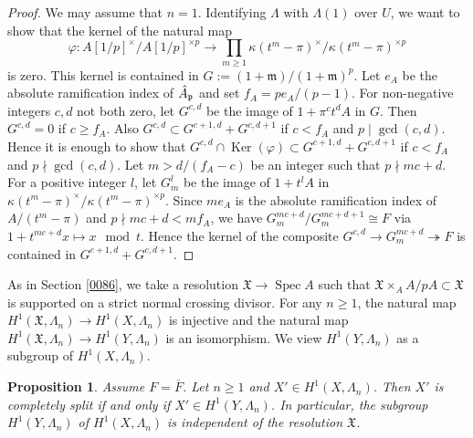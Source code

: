 \documentclass{amsart}
\newtheorem{Prop}[Thm]{Proposition}
\theoremstyle{remark}
\numberwithin{equation}{section}
\newcommand{\onto}{\twoheadrightarrow}
\newcommand{\closure}[1]{\overline{#1}}
\newcommand{\ideal}[1]{\mathfrak{#1}}
\DeclareMathOperator{\Ker}{Ker}
\DeclareMathOperator{\Spec}{Spec}
\begin{document}
\begin{proof}
	We may assume that $n = 1$.
	Identifying $\Lambda$ with $\Lambda(1)$ over $U$,
	we want to show that the kernel of the natural map
		\[
				\varphi
			\colon
				A[1 / p]^{\times} / A[1 / p]^{\times p}
			\to
				\prod_{m \ge 1}
					\kappa(t^{m} - \pi)^{\times} / \kappa(t^{m} - \pi)^{\times p}
		\]
	is zero.
	This kernel is contained in $G := (1 + \ideal{m}) /  (1 + \ideal{m})^{p}$.
	Let $e_{A}$ be the absolute ramification index of $\Hat{A}_{\ideal{p}}$
	and set $f_{A} = p e_{A} / (p - 1)$.
	For non-negative integers $c, d$ not both zero,
	let $G^{c, d}$ be the image of $1 + \pi^{c} t^{d} A$ in $G$.
	Then $G^{c, d} = 0$ if $c \ge f_{A}$.
	Also $G^{c, d} \subset G^{c + 1, d} + G^{c, d + 1}$
	if $c < f_{A}$ and $p \mid \gcd(c, d)$.
	Hence it is enough to show that
	$G^{c, d} \cap \Ker(\varphi) \subset G^{c + 1, d} + G^{c, d + 1}$
	if $c < f_{A}$ and $p \nmid \gcd(c, d)$.
	Let $m > d / (f_{A} - c)$ be an integer such that $p \nmid m c + d$.
	For a positive integer $l$,
	let $G_{m}^{l}$ be the image of $1 + t^{l} A$ in
	$\kappa(t^{m} - \pi)^{\times} / \kappa(t^{m} - \pi)^{\times p}$.
	Since $m e_{A}$ is the absolute ramification index of $A / (t^{m} - \pi)$
	and $p \nmid m c + d < m f_{A}$,
	we have $G_{m}^{m c + d} / G_{m}^{m c + d + 1} \cong F$
	via $1 + t^{m c + d} x \mapsto x \mod t$.
	Hence the kernel of the composite
		$
				G^{c, d}
			\to
				G_{m}^{m c + d}
			\onto
				F
		$
	is contained in $G^{c + 1, d} + G^{c, d + 1}$.
\end{proof}

As in Section \ref{0086},
we take a resolution $\mathfrak{X} \to \Spec A$
such that $\mathfrak{X} \times_{A} A / p A \subset \mathfrak{X}$ is supported on a strict normal crossing divisor.
For any $n \ge 1$,
the natural map $H^{1}(\mathfrak{X}, \Lambda_{n}) \to H^{1}(X, \Lambda_{n})$ is injective
and the natural map $H^{1}(\mathfrak{X}, \Lambda_{n}) \to H^{1}(Y, \Lambda_{n})$ is an isomorphism.
We view $H^{1}(Y, \Lambda_{n})$ as a subgroup of $H^{1}(X, \Lambda_{n})$.

\begin{Prop} \label{0091}
	Assume $F = \closure{F}$.
	Let $n \ge 1$ and $X' \in H^{1}(X, \Lambda_{n})$.
	Then $X'$ is completely split if and only if
	$X' \in H^{1}(Y, \Lambda_{n})$.
	In particular, the subgroup $H^{1}(Y, \Lambda_{n})$ of $H^{1}(X, \Lambda_{n})$
	is independent of the resolution $\mathfrak{X}$.
\end{Prop}
\end{document}
